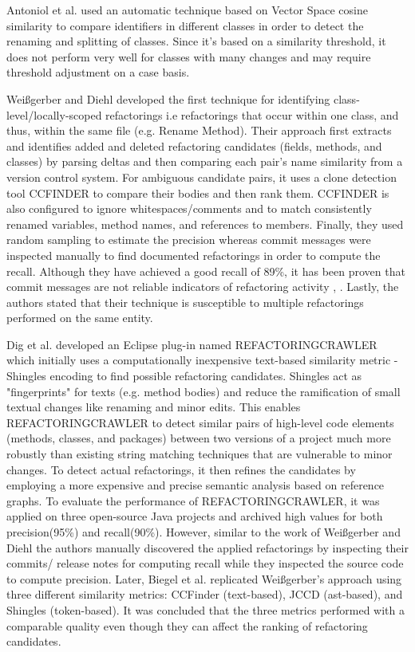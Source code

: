 \documentclass[letterpaper,12pt,onecolumn,final]{report}
\begin{document}
Antoniol et al. \cite{Antoniol2004} used an automatic technique based on Vector Space cosine similarity to compare identifiers in different classes in order to detect the renaming and splitting of classes. Since it's based on a similarity threshold, it does not perform very well for classes with many changes and may require threshold adjustment on a case basis.

Weißgerber and Diehl \cite{Weissgerber2006} developed the first technique for identifying class-level/locally-scoped refactorings i.e refactorings that occur within one class, and thus, within the same file (e.g. Rename Method). Their approach first extracts and identifies added and deleted refactoring candidates (fields, methods, and classes) by parsing deltas and then comparing each pair's name similarity from a version control system. For ambiguous candidate pairs, it uses a clone detection tool CCFINDER \cite{Kamiya2002} to compare their bodies and then rank them. CCFINDER is also configured to ignore whitespaces/comments and to match consistently renamed variables, method names, and references to members. Finally, they used random sampling to estimate the precision whereas commit messages were inspected manually to find documented refactorings in order to compute the recall. Although they have achieved a good recall of 89\%, it has been proven that commit messages are not reliable indicators of refactoring activity \cite{Krasniqi2020}, \cite{MurphyHill2012}. Lastly, the authors stated that their technique is susceptible to multiple refactorings performed on the same entity.

Dig et al. \cite{Dig2006} developed an Eclipse plug-in named REFACTORINGCRAWLER which initially uses a computationally inexpensive text-based similarity metric - Shingles encoding \cite{Broder1997} to find possible refactoring candidates. Shingles act as "fingerprints" for texts (e.g. method bodies) and reduce the ramification of small textual changes like renaming and minor edits. This enables REFACTORINGCRAWLER to detect similar pairs of high-level code elements (methods, classes, and packages) between two versions of a project much more robustly than existing string matching techniques that are vulnerable to minor changes. To detect actual refactorings, it then refines the candidates by employing a more expensive and precise semantic analysis based on reference graphs. To evaluate the performance of REFACTORINGCRAWLER, it was applied on three open-source Java projects and archived high values for both precision(95\%) and recall(90\%). However, similar to the work of Weißgerber and Diehl \cite{Weissgerber2006} the authors manually discovered the applied refactorings by inspecting their commits/ release notes for computing recall while they inspected the source code to compute precision. Later, Biegel et al. \cite{Biegel2011} replicated Weißgerber’s approach using three different similarity metrics: CCFinder (text-based), JCCD \cite{Biegel2010} (ast-based), and Shingles (token-based). It was concluded that the three metrics performed with a comparable quality even though they can affect the ranking of refactoring candidates.
\end{document}

